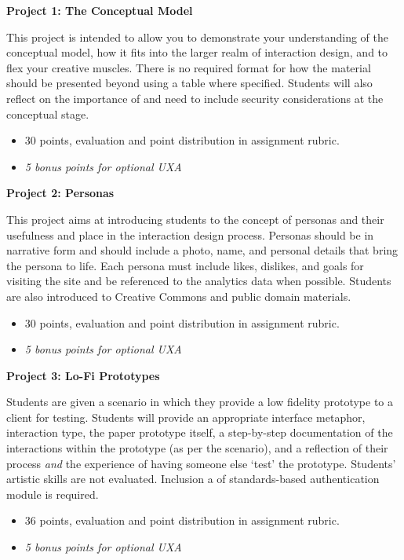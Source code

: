\documentclass[]{article}
\providecommand{\tightlist}{%
  \setlength{\itemsep}{0pt}\setlength{\parskip}{0pt}}
\begin{document}
\textbf{Project 1: The Conceptual Model}

This project is intended to allow you to demonstrate your understanding
of the conceptual model, how it fits into the larger realm of
interaction design, and to flex your creative muscles. There is no
required format for how the material should be presented beyond using a
table where specified. Students will also reflect on the importance of
and need to include security considerations at the conceptual stage.

\begin{itemize}
\tightlist
\item
  30 points, evaluation and point distribution in assignment rubric.
\item
  \emph{5 bonus points for optional UXA}
\end{itemize}

\textbf{Project 2: Personas}

This project aims at introducing students to the concept of personas and
their usefulness and place in the interaction design process. Personas
should be in narrative form and should include a photo, name, and
personal details that bring the persona to life. Each persona must
include likes, dislikes, and goals for visiting the site and be
referenced to the analytics data when possible. Students are also
introduced to Creative Commons and public domain materials.

\begin{itemize}
\tightlist
\item
  30 points, evaluation and point distribution in assignment rubric.
\item
  \emph{5 bonus points for optional UXA}
\end{itemize}

\textbf{Project 3: Lo-Fi Prototypes}

Students are given a scenario in which they provide a low fidelity
prototype to a client for testing. Students will provide an appropriate
interface metaphor, interaction type, the paper prototype itself, a
step-by-step documentation of the interactions within the prototype (as
per the scenario), and a reflection of their process \emph{and} the
experience of having someone else `test' the prototype. Students'
artistic skills are not evaluated. Inclusion a of standards-based
authentication module is required.

\begin{itemize}
\tightlist
\item
  36 points, evaluation and point distribution in assignment rubric.
\item
  \emph{5 bonus points for optional UXA}
\end{itemize}
\end{document}
